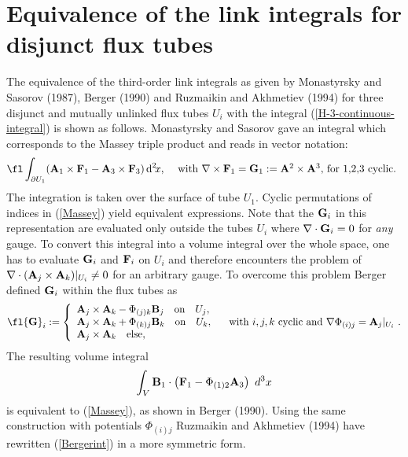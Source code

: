 \documentclass[10pt]{iopart}
\def \d{\mbox{d}}
\def \dxx{\,\d^{2}\!x}
\def \bA{{\mathbf{A}}}
\begin{document}
\section{Equivalence of the link integrals for disjunct flux tubes} \label{Equivalentintegrals}
The equivalence of the third-order link integrals as given by  
Monastyrsky and Sasorov (1987), Berger (1990)
and Ruzmaikin and Akhmetiev (1994) for three disjunct and mutually
unlinked flux tubes $U_i$ with the integral
(\ref{H-3-continuous-integral}) is shown as follows. Monastyrsky and
Sasorov gave an integral which corresponds to the Massey triple product
and reads in vector notation:
\begin{equation}\fl
 \int_{\partial U_1} ({\bf A}_1 \times {\bf F}_1 - {\bf A}_3 \times
 {\bf F}_3) \dxx,~~
 \begin{array}{r}
    \mbox{with $\nabla \times {\bf F}_1 = {\bf G}_1 :=
    \bA^2\times\bA^3$,}
    \mbox{ for 1,2,3 cyclic.}
 \end{array}\label{Massey} 
\end{equation}
The integration is taken over the surface of tube $U_1$. Cyclic
permutations of indices in (\ref{Massey}) yield equivalent
expressions. Note that the ${\bf G}_i$ in this representation are
evaluated only outside the tubes $U_i$ where $\nabla \cdot {\bf
  G}_i=0$ for {\it any} gauge. To convert this integral into a volume
integral over the whole space, one has to evaluate ${\bf G}_i$ and
${\bf F}_i$  on $U_i$ and therefore encounters the problem of $\nabla
\cdot ({\bf A}_j \times {\bf A}_k) |_{U_i} \neq 0 $ for an arbitrary
gauge. To overcome this problem Berger defined ${\bf G}_i$ within the
flux tubes as
\begin{equation} \fl
{\bf G}_i :=  \left\{\begin{array}{l} {\bf A}_j \times {\bf A}_k - \Phi_{(j)k} {\bf B}_j \quad \mbox{on} \quad U_j , \\ 
 {\bf A}_j \times {\bf A}_k  + \Phi_{(k)j} {\bf B}_k\quad \mbox{on} \quad U_k , \\  
 {\bf A}_j \times {\bf A}_k \quad \mbox{else}, \\ 
                   \end{array} \right. 
\quad \mbox{with}\  i,j,k \ \mbox{cyclic and}\ \nabla \Phi_{(i)j}  = {\bf A}_j|_{U_i} \ .  \label{BergerG} 
\end{equation}
The resulting volume integral 
\begin{eqnarray}
\int_V{{\bf B}_1 \cdot\left({\bf F}_1 - \Phi_{(1)2} {\bf A}_3 \right) \ d^3x } \label{Bergerint}
\end{eqnarray}
is equivalent to (\ref{Massey}), as shown in Berger (1990).
Using the same construction with potentials  $\Phi_{(i)j}$ Ruzmaikin and
Akhmetiev (1994) have rewritten (\ref{Bergerint}) in a more symmetric form.
\end{document}
